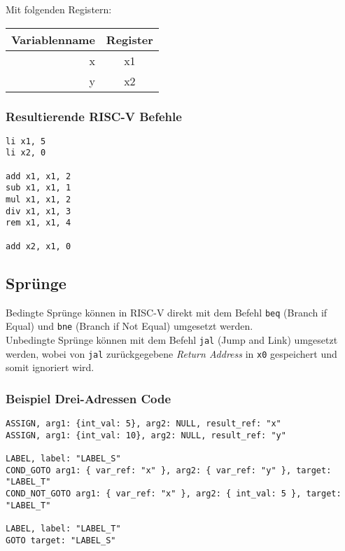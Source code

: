 Mit folgenden Registern:

\begin{table}[H]
	\begin{center}
		\begin{tabular}{| r | c |}
			\hline
			Variablenname & Register \\
			\hline
			x & x1 \\
			y & x2 \\
			\hline
		\end{tabular}
	\end{center}
\end{table}

\subsubsection{Resultierende RISC-V Befehle}

\begin{lstlisting}
li x1, 5
li x2, 0

add x1, x1, 2
sub x1, x1, 1
mul x1, x1, 2
div x1, x1, 3
rem x1, x1, 4

add x2, x1, 0
\end{lstlisting}

\subsection{Sprünge}

Bedingte Sprünge können in RISC-V direkt mit dem Befehl \texttt{beq} (Branch if Equal) und \texttt{bne} (Branch if Not Equal) umgesetzt werden.\\
Unbedingte Sprünge können mit dem Befehl \texttt{jal} (Jump and Link) umgesetzt werden, wobei von \texttt{jal} zurückgegebene \textit{Return Address} in \texttt{x0} gespeichert und somit ignoriert wird.

\subsubsection{Beispiel Drei-Adressen Code}

\begin{lstlisting}
ASSIGN, arg1: {int_val: 5}, arg2: NULL, result_ref: "x"
ASSIGN, arg1: {int_val: 10}, arg2: NULL, result_ref: "y"

LABEL, label: "LABEL_S"
COND_GOTO arg1: { var_ref: "x" }, arg2: { var_ref: "y" }, target: "LABEL_T"
COND_NOT_GOTO arg1: { var_ref: "x" }, arg2: { int_val: 5 }, target: "LABEL_T"

LABEL, label: "LABEL_T"
GOTO target: "LABEL_S"
\end{lstlisting}

